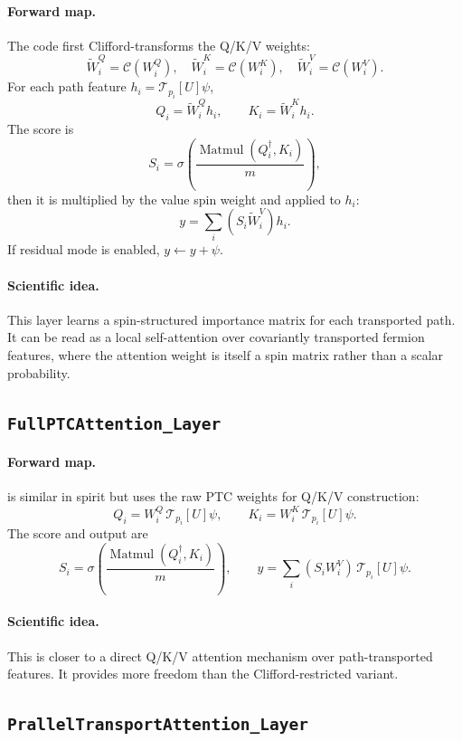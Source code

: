 \documentclass[11pt]{article}
\newcommand{\code}[1]{\texttt{\detokenize{#1}}}
\newcommand{\field}{\psi}
\newcommand{\U}{U}
\newcommand{\pathop}{\mathcal{T}}
\begin{document}
\paragraph{Forward map.}
The code first Clifford-transforms the Q/K/V weights:
\[
  \widetilde W_i^Q=\mathcal{C}(W_i^Q),\quad
  \widetilde W_i^K=\mathcal{C}(W_i^K),\quad
  \widetilde W_i^V=\mathcal{C}(W_i^V).
\]
For each path feature $h_i=\pathop_{p_i}[\U]\field$,
\[
  Q_i=\widetilde W_i^Qh_i,\qquad
  K_i=\widetilde W_i^Kh_i.
\]
The score is
\[
  S_i
  =
  \sigma\left(
  \frac{\operatorname{Matmul}(Q_i^\dagger,K_i)}{m}
  \right),
\]
then it is multiplied by the value spin weight and applied to $h_i$:
\[
  y
  =
  \sum_i
  \left(S_i\widetilde W_i^V\right) h_i.
\]
If residual mode is enabled, $y\leftarrow y+\field$.

\paragraph{Scientific idea.}
This layer learns a spin-structured importance matrix for each transported
path. It can be read as a local self-attention over covariantly transported
fermion features, where the attention weight is itself a spin matrix rather
than a scalar probability.

\subsection[FullPTCAttention Layer]{\texttt{FullPTCAttention\_Layer}}

\paragraph{Forward map.}
\code{FullPTCAttention_Layer} is similar in spirit but uses the raw PTC weights
for Q/K/V construction:
\[
  Q_i = W_i^Q\,\pathop_{p_i}[\U]\field,\qquad
  K_i = W_i^K\,\pathop_{p_i}[\U]\field.
\]
The score and output are
\[
  S_i = \sigma\left(
  \frac{\operatorname{Matmul}(Q_i^\dagger,K_i)}{m}
  \right),
  \qquad
  y = \sum_i (S_i W_i^V)\,\pathop_{p_i}[\U]\field.
\]

\paragraph{Scientific idea.}
This is closer to a direct Q/K/V attention mechanism over path-transported
features. It provides more freedom than the Clifford-restricted variant.

\subsection[PrallelTransportAttention Layer]{\texttt{PrallelTransportAttention\_Layer}}
\end{document}
